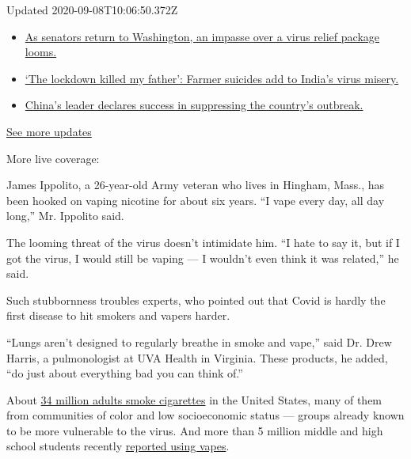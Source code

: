 Updated 2020-09-08T10:06:50.372Z

\begin{itemize}
\tightlist
\item
  \href{https://www.nytimes3xbfgragh.onion/2020/09/08/world/covid-19-coronavirus.html?action=click\&pgtype=Article\&state=default\&region=MAIN_CONTENT_1\&context=storylines_live_updates\#link-4a77847f}{As
  senators return to Washington, an impasse over a virus relief package
  looms.}
\item
  \href{https://www.nytimes3xbfgragh.onion/2020/09/08/world/covid-19-coronavirus.html?action=click\&pgtype=Article\&state=default\&region=MAIN_CONTENT_1\&context=storylines_live_updates\#link-1c973131}{`The
  lockdown killed my father': Farmer suicides add to India's virus
  misery.}
\item
  \href{https://www.nytimes3xbfgragh.onion/2020/09/08/world/covid-19-coronavirus.html?action=click\&pgtype=Article\&state=default\&region=MAIN_CONTENT_1\&context=storylines_live_updates\#link-adc17f7}{China's
  leader declares success in suppressing the country's outbreak.}
\end{itemize}

\href{https://www.nytimes3xbfgragh.onion/2020/09/08/world/covid-19-coronavirus.html?action=click\&pgtype=Article\&state=default\&region=MAIN_CONTENT_1\&context=storylines_live_updates}{See
more updates}

More live coverage:

James Ippolito, a 26-year-old Army veteran who lives in Hingham, Mass.,
has been hooked on vaping nicotine for about six years. ``I vape every
day, all day long,'' Mr. Ippolito said.

The looming threat of the virus doesn't intimidate him. ``I hate to say
it, but if I got the virus, I would still be vaping --- I wouldn't even
think it was related,'' he said.

Such stubbornness troubles experts, who pointed out that Covid is hardly
the first disease to hit smokers and vapers harder.

``Lungs aren't designed to regularly breathe in smoke and vape,'' said
Dr. Drew Harris, a pulmonologist at UVA Health in Virginia. These
products, he added, ``do just about everything bad you can think of.''

About
\href{https://www.cdc.gov/mmwr/volumes/68/ss/ss6812a1.htm?s_cid=ss6812a1_w}{34
million adults smoke cigarettes} in the United States, many of them from
communities of color and low socioeconomic status --- groups already
known to be more vulnerable to the virus. And more than 5 million middle
and high school students recently
\href{https://www.cdc.gov/mmwr/volumes/68/ss/ss6812a1.htm?s_cid=ss6812a1_w}{reported
using vapes}.

